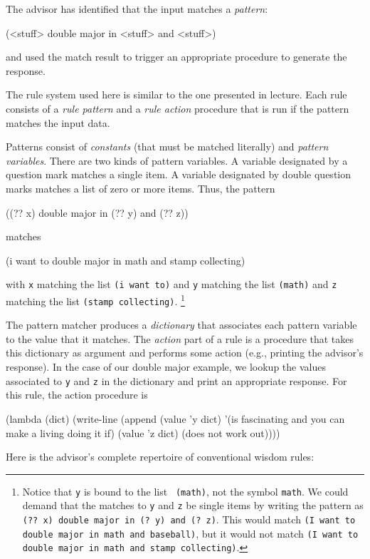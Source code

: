 The advisor has identified that the input matches a {\em pattern}:

\beginlisp
(<stuff> double major in <stuff> and <stuff>)
\endlisp

\noindent
and used the match result to trigger an appropriate procedure
to generate the response.

The rule system used here is similar to the one presented in lecture.
Each rule consists of a {\em rule pattern} and a {\em rule action}
procedure that is run if the pattern matches the input data.

Patterns consist of {\em constants} (that must be matched literally)
and {\em pattern variables}.  There are two kinds of pattern
variables.  A variable designated by a question mark matches a single
item.  A variable designated by double question marks matches a list
of zero or more items.  Thus, the pattern

\beginlisp
((?? x) double major in (?? y) and (?? z))
\endlisp

\noindent
matches

\beginlisp
(i want to double major in math and stamp collecting)
\endlisp

\noindent
with {\tt x} matching the list {\tt (i want to)} and {\tt y} matching
the list {\tt (math)} and {\tt z} matching the list {\tt (stamp
collecting)}.  \footnote{Notice that {\tt y} is bound to the list {\tt
(math)}, not the symbol {\tt math}.  We could demand that the matches
to {\tt y} and {\tt z} be single items by writing the pattern as {\tt
(?? x) double major in (? y) and (? z)}.  This would match {\tt (I
want to double major in math and baseball)}, but it would not match
{\tt (I want to double major in math and stamp collecting)}.} 

The pattern matcher produces a {\em dictionary} that associates each
pattern variable to the value that it matches.  The {\em action} part
of a rule is a procedure that takes this dictionary as argument and
performs some action (e.g., printing the advisor's response).
In the case of our double major example, we lookup the values
associated to {\tt y} and {\tt z} in the dictionary and print an
appropriate response.  For this rule, the action procedure is

\beginlisp
(lambda (dict)
  (write-line
   (append
    (value 'y dict)
    '(is fascinating and you can make a living doing it if)
    (value 'z dict)
    (does not work out))))
\endlisp

Here is the advisor's complete repertoire of conventional wisdom
rules:

